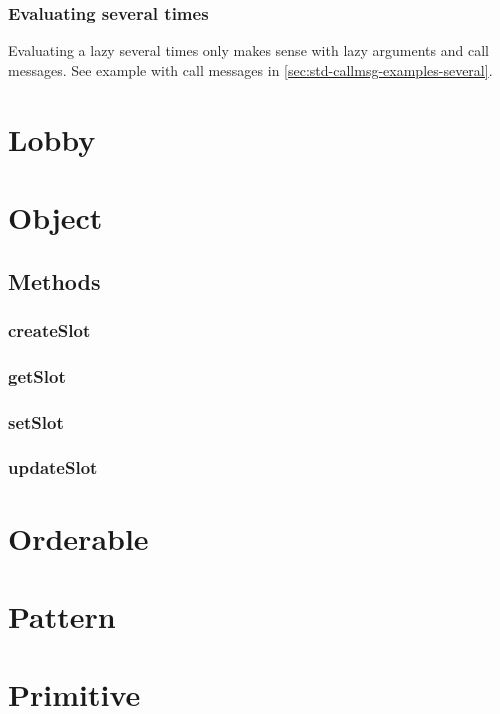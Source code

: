 \subsubsection{Evaluating several times}

Evaluating a lazy several times only makes sense with lazy arguments
and call messages. See example with call messages in
\autoref{sec:std-callmsg-examples-several}.



\section{Lobby}
\section{Object}

\subsection{Methods}

\subsubsection{createSlot}
\label{sec:std-object-createslot}

\subsubsection{getSlot}
\label{sec:std-object-getslot}

\subsubsection{setSlot}
\label{sec:std-object-setslot}

\subsubsection{updateSlot}
\label{sec:std-object-updateslot}

\section{Orderable}
\section{Pattern}
\section{Primitive}
